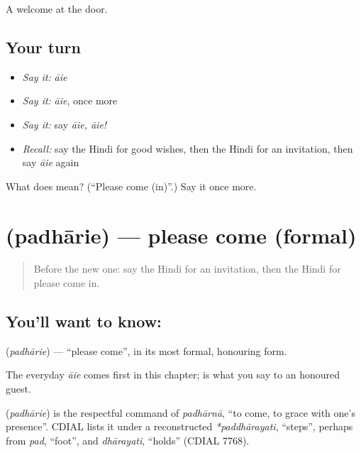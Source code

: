 \begin{grammarlens}[title={What you've built}]
A welcome at the door.
\end{grammarlens}

\subsection*{Your turn}
\begin{itemize}
\raggedright
  \item \emph{Say it:} \emph{āie}
  \item \emph{Say it:} \emph{āie}, once more
  \item \emph{Say it:} say \emph{āie, āie!}
  \item \emph{Recall:} say the Hindi for good wishes, then the Hindi for an invitation, then say \emph{āie} again
\end{itemize}

\begin{tcolorbox}[breakable,colback=teal!4,colframe=teal!35!black,title={Before you move on}]
What does  mean? (\textquotedblleft{}Please come (in)\textquotedblright{}.) Say it once more.
\end{tcolorbox}
\section[\texorpdfstring{\hi{पधारिए} (padhārie)}{पधारिए (padhārie)}]{ (padhārie) — please come (formal)}

\label{lesson:HI-C115-padharie}



\begin{quote}
Before the new one: say the Hindi for an invitation, then the Hindi for please come in.
\end{quote}

\subsection*{You'll want to know: }
\textbf{} (\emph{padhārie}) — \textquotedblleft{}please come\textquotedblright{}, in its most formal, honouring form.

The everyday \emph{āie} comes first in this chapter; \textbf{} is what you say to an honoured guest.

\begin{cousinweb}
\textbf{} (\emph{padhārie}) is the respectful command of \emph{padhārnā}, \textquotedblleft{}to come, to grace with one's presence\textquotedblright{}. CDIAL lists it under a reconstructed \emph{*paddhārayati}, \textquotedblleft{}steps\textquotedblright{}, perhaps from \emph{pad}, \textquotedblleft{}foot\textquotedblright{}, and \emph{dhārayati}, \textquotedblleft{}holds\textquotedblright{} (CDIAL 7768).
\end{cousinweb}

